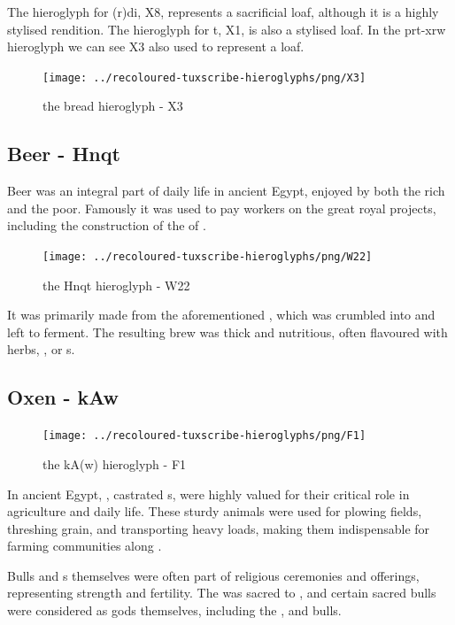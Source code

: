 The hieroglyph for (r)di, X8, represents a sacrificial loaf, although it is a highly stylised rendition. The hieroglyph for t, X1, is also a stylised loaf. In the prt-xrw hieroglyph we can see X3 also used to represent a loaf.

\begin{figure} [H]
	\centering
	\texttt{[image: ../recoloured-tuxscribe-hieroglyphs/png/X3]}
	\caption{the bread hieroglyph - X3}
\end{figure}

\subsection*{Beer - Hnqt}

Beer was an integral part of daily life in ancient Egypt, enjoyed by both the rich and the poor. Famously it was used to pay workers on the great royal projects, including the construction of the  of .

\begin{figure} [H]
	\centering
	\texttt{[image: ../recoloured-tuxscribe-hieroglyphs/png/W22]}
	\caption{the Hnqt hieroglyph - W22}
\end{figure}

It was primarily made from the aforementioned , which was crumbled into  and left to ferment. The resulting brew was thick and nutritious, often flavoured with herbs, , or s.

\subsection*{Oxen - kAw}

\begin{figure} [H]
	\centering
	\texttt{[image: ../recoloured-tuxscribe-hieroglyphs/png/F1]}
	\caption{the kA(w) hieroglyph - F1}
\end{figure}

In ancient Egypt, , castrated s, were highly valued for their critical role in agriculture and daily life. These sturdy animals were used for plowing fields, threshing grain, and transporting heavy loads, making them indispensable for farming communities along .

Bulls and s themselves were often part of religious ceremonies and offerings, representing strength and fertility. The  was sacred to , and certain sacred bulls were considered as gods themselves, including the ,  and  bulls.

